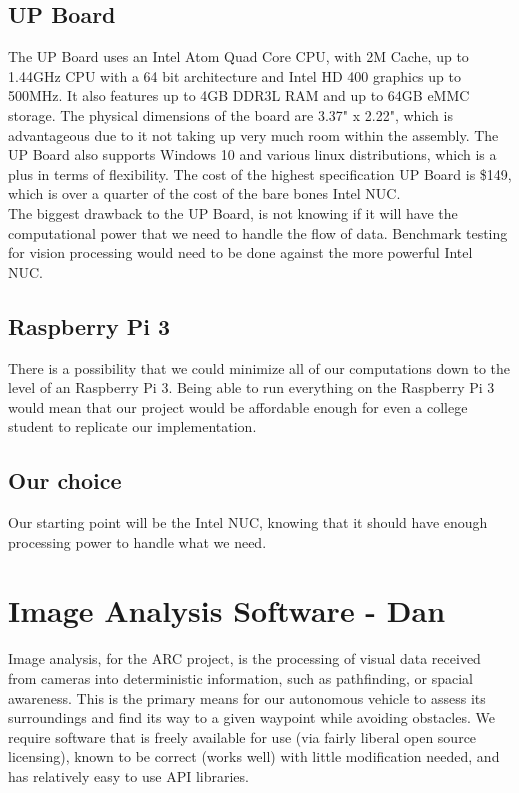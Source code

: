 \documentclass[compsoc,draftclsnofoot,onecolumn,10pt]{IEEEtran}
\begin{document}
\subsection{UP Board}
The UP Board uses an Intel Atom Quad Core CPU, with 2M Cache, up to 1.44GHz CPU with a 64 bit architecture and Intel HD 400 graphics up to 500MHz. 
It also features up to 4GB DDR3L RAM and up to 64GB eMMC storage. 
The physical dimensions of the board are 3.37" x 2.22", which is advantageous due to it not taking up very much room within the assembly. 
The UP Board also supports Windows 10 and various linux distributions, which is a plus in terms of flexibility. 
The cost of the highest specification UP Board is \$149, which is over a quarter of the cost of the bare bones Intel NUC. \\
The biggest drawback to the UP Board, is not knowing if it will have the computational power that we need to handle the flow of data. 
Benchmark testing for vision processing would need to be done against the more powerful Intel NUC. 



\subsection{Raspberry Pi 3}
There is a possibility that we could minimize all of our computations down to the level of an Raspberry Pi 3. 
Being able to run everything on the Raspberry Pi 3 would mean that our project would be affordable enough for even a college student to replicate our implementation. 
\subsection{Our choice}
Our starting point will be the Intel NUC, knowing that it should have enough processing power to handle what we need. 


\section{Image Analysis Software - Dan}
Image analysis, for the ARC project, is the processing of visual data received
from cameras into deterministic information, such as pathfinding, or spacial
awareness. This is the primary means for our autonomous vehicle to assess its
surroundings and find its way to a given waypoint while avoiding obstacles. We
require software that is freely available for use (via fairly liberal open
source licensing), known to be correct (works well) with little modification
needed, and has relatively easy to use API libraries.
\end{document}
